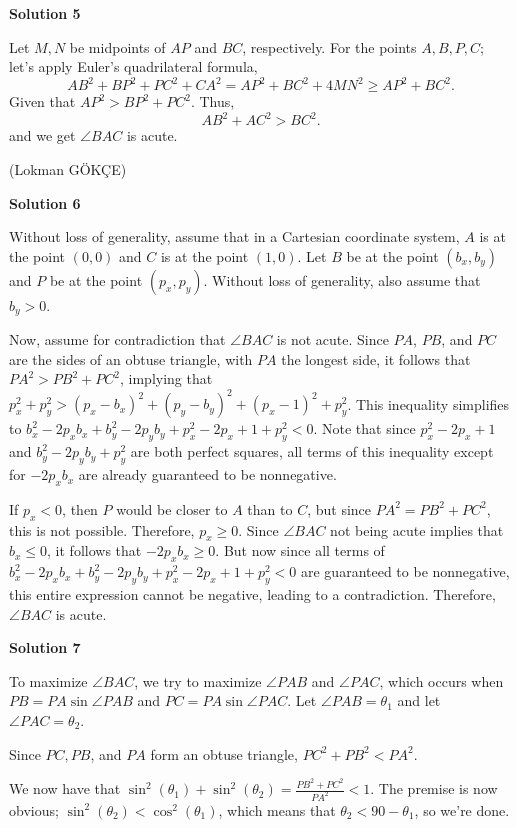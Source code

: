 \begin{enumerate}
 



\textbf{Solution 5}

Let $M, N$ be midpoints of $AP$ and $BC$, respectively. For the points $A, B, P, C$; let's apply Euler's quadrilateral formula,
 \[AB^2 + BP^2 + PC^2 + CA^2 = AP^2 + BC^2 + 4MN^2 \geq AP^2 + BC^2 .\]Given that $AP^2 > BP^2 + PC^2$. Thus,
 \[AB^2 + AC^2 > BC^2 .\] and we get $\angle BAC$ is acute.

 (Lokman GÖKÇE)

 



\textbf{Solution 6}

Without loss of generality, assume that in a Cartesian coordinate system, $A$ is at the point $(0, 0)$ and $C$ is at the point $(1,0)$. Let $B$ be at the point $(b_x,b_y)$ and $P$ be at the point $(p_x,p_y)$. Without loss of generality, also assume that $b_y>0$.

 Now, assume for contradiction that $\angle BAC$ is not acute. Since $PA$, $PB$, and $PC$ are the sides of an obtuse triangle, with $PA$ the longest side, it follows that $PA^2>PB^2+PC^2$, implying that $p_x^2+p_y^2>(p_x-b_x)^2+(p_y-b_y)^2+(p_x-1)^2+p_y^2$. This inequality simplifies to $b_x^2-2p_x b_x+b_y^2-2p_y b_y+p_x^2-2p_x+1+p_y^2<0$. Note that since $p_x^2-2p_x+1$ and $b_y^2-2p_y b_y+p_y^2$ are both perfect squares, all terms of this inequality except for $-2p_x b_x$ are already guaranteed to be nonnegative.

 If $p_x<0$, then $P$ would be closer to $A$ than to $C$, but since $PA^2=PB^2+PC^2$, this is not possible. Therefore, $p_x \geq 0$. Since $\angle BAC$ not being acute implies that $b_x \leq 0$, it follows that $-2p_x b_x \geq 0$. But now since all terms of $b_x^2-2p_x b_x+b_y^2-2p_y b_y+p_x^2-2p_x+1+p_y^2<0$ are guaranteed to be nonnegative, this entire expression cannot be negative, leading to a contradiction. Therefore, $\angle BAC$ is acute.

 



\textbf{Solution 7}

To maximize $\angle BAC$, we try to maximize $\angle PAB$ and $\angle PAC$, which occurs when $PB = PA \sin \angle PAB$ and $PC = PA \sin \angle PAC$. Let $\angle PAB = \theta_1$ and let $\angle PAC = \theta_2$. 

 Since $PC, PB$, and $PA$ form an obtuse triangle, $PC^2 + PB^2 < PA^2$. 

 We now have that $\sin^2(\theta_1) + \sin^2(\theta_2) = \frac{PB^2+PC^2}{PA^2} < 1$. The premise is now obvious; $\sin^2(\theta_2) < \cos^2(\theta_1)$, which means that $\theta_2 < 90 - \theta_1$, so we're done.


\end{enumerate}
